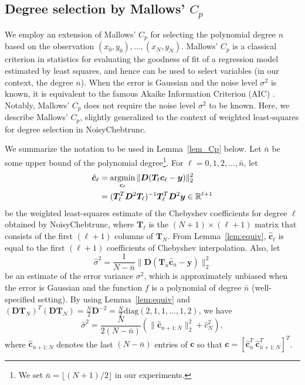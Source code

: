 \documentclass[final,onefignum,onetabnum]{siamart220329}
\def\mainalg{NoisyChebtrunc}
\newcommand{\argmin}{\mathop{\rm argmin}\limits}
\newcommand{\vct}[1]{\bm{#1}}
\newcommand{\mtx}[1]{\bm{#1}}
\begin{document}
\subsection{Degree selection by Mallows' $C_p$}\label{sec:degselect}

We employ an extension of Mallows' $C_p$ \cite{mallows2000some,james2013introduction} for selecting the polynomial degree $n$ based on the observation $(x_0,y_0),\dots,(x_N,y_N)$. 
Mallows' $C_p$ is a classical criterion in statistics for evaluating the goodness of fit of a regression model estimated by least squares, and hence can be used to select variables (in our context, the degree $n$).
When the error is Gaussian and the noise level $\sigma^2$ is known, it is equivalent to the famous Akaike Information Criterion (AIC) \cite{akaike1998information,konishi2008information}. 
Notably, Mallows' $C_p$ does not require the noise level $\sigma^2$ to be known.
Here, we describe
Mallows' $C_p${, slightly generalized} to the context of weighted least-squares for degree selection in \mainalg.

We summarize the notation to be used in Lemma~\ref{lem_Cp} below.
Let $\bar{n}$ be some upper bound of the polynomial degree\footnote{We set $\bar{n}=\lfloor (N+1)/2\rfloor$ in our experiments. 
}. For $\ell=0,1,2,\dots,\bar{n}$, let
\begin{align*}
	\hat{\vct{c}}_{\ell} &= \argmin_{\vct{c}_{\ell}} \| \mtx{D}(\mtx{T}_{\ell} \vct{c}_{\ell} -\vct{y}) \|_2^2 \\
	&= (\mtx{T}_{\ell}^T \mtx{D}^2 \mtx{T}_{\ell})^{-1} \mtx{T}_{\ell}^T \mtx{D}^2 \vct{y} \in \mathbb{R}^{\ell+1}
\end{align*}
be the weighted least-squares estimate of the Chebyshev coefficients for degree $\ell$ obtained by {\mainalg}, where $\mtx{T}_{\ell}$ is the $(N+1) \times ({\ell}+1)$ matrix that consists of the first $(\ell+1)$ columns of $\mtx{T}_N$.
From Lemma~\ref{lem:equiv}, $\hat{\vct{c}}_{\ell}$ is equal to the first $(\ell+1)$ coefficients of Chebyshev interpolation.
Also, let
\[
\hat{\sigma}^2 = \frac{1}{N-\bar{n}} \| 
\mtx{{D}}(
\mtx{T}_{\bar{n}} \hat{\vct{c}}_{\bar{n}} - \vct{y}) \|_2^2
\]
be an estimate of the error variance $\sigma^2$, which is approximately unbiased when the error is Gaussian and the function $f$ is a polynomial of degree $\bar{n}$ (well-specified setting). 
By using Lemma~\ref{lem:equiv} and $(\mtx{DT}_N)^T(\mtx{DT}_N)=\frac{N}{2}\mtx{D}^{-2}=\frac{N}{2}\mbox{diag}( 2,1,1,\ldots,1,2 )$, we have
\[
\hat{\sigma}^2 = \frac{N}{2(N-\bar{n})} (\| \hat{\vct{c}}_{\bar{n}+1:N} \|_2^2 + \hat{c}_{N}^2),
\]
where $\hat{\vct{c}}_{\bar{n}+1:N}$ denotes the last $(N-\bar{n})$ entries of $\vct{c}$ so that $\vct{c} = [\hat{\vct{c}}_{\bar{n}}^T \ \hat{\vct{c}}_{\bar{n}+1:N}^T]^T$.
\end{document}
